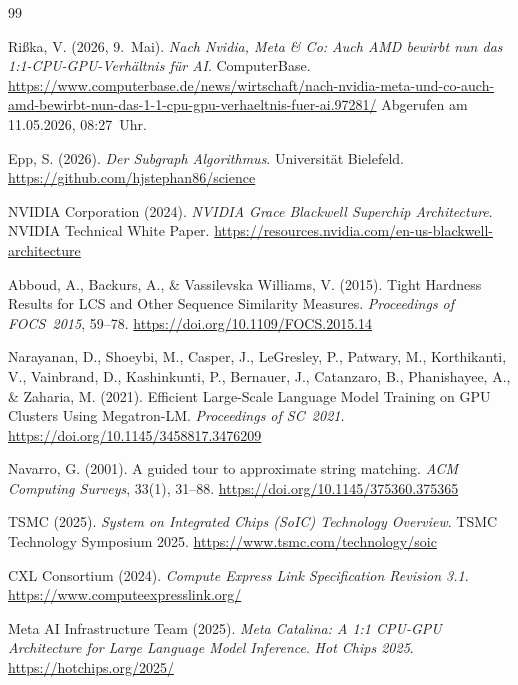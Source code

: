 ﻿\documentclass[a4paper,12pt]{article}
\theoremstyle{definition}
\begin{document}
\begin{thebibliography}{99}

Ri\ss{}ka, V. (2026, 9.\ Mai).
\textit{Nach Nvidia, Meta \& Co: Auch AMD bewirbt nun das 1:1-CPU-GPU-Verh\"altnis f\"ur AI}.
ComputerBase.
\url{https://www.computerbase.de/news/wirtschaft/nach-nvidia-meta-und-co-auch-amd-bewirbt-nun-das-1-1-cpu-gpu-verhaeltnis-fuer-ai.97281/}
Abgerufen am 11.05.2026, 08:27~Uhr.

Epp, S. (2026).
\textit{Der Subgraph Algorithmus}.
Universit\"at Bielefeld.
\url{https://github.com/hjstephan86/science}

NVIDIA Corporation (2024).
\textit{NVIDIA Grace Blackwell Superchip Architecture}.
NVIDIA Technical White Paper.
\url{https://resources.nvidia.com/en-us-blackwell-architecture}

Abboud, A., Backurs, A., \& Vassilevska Williams, V. (2015).
Tight Hardness Results for LCS and Other Sequence Similarity Measures.
\textit{Proceedings of FOCS~2015}, 59--78.
\url{https://doi.org/10.1109/FOCS.2015.14}

Narayanan, D., Shoeybi, M., Casper, J., LeGresley, P., Patwary, M.,
Korthikanti, V., Vainbrand, D., Kashinkunti, P., Bernauer, J.,
Catanzaro, B., Phanishayee, A., \& Zaharia, M. (2021).
Efficient Large-Scale Language Model Training on GPU Clusters Using
Megatron-LM.
\textit{Proceedings of SC~2021}.
\url{https://doi.org/10.1145/3458817.3476209}

Navarro, G. (2001).
A guided tour to approximate string matching.
\textit{ACM Computing Surveys}, 33(1), 31--88.
\url{https://doi.org/10.1145/375360.375365}

TSMC (2025).
\textit{System on Integrated Chips (SoIC) Technology Overview}.
TSMC Technology Symposium 2025.
\url{https://www.tsmc.com/technology/soic}

CXL Consortium (2024).
\textit{Compute Express Link Specification Revision 3.1}.
\url{https://www.computeexpresslink.org/}

Meta AI Infrastructure Team (2025).
\textit{Meta Catalina: A 1:1 CPU-GPU Architecture for Large Language Model Inference}.
\textit{Hot Chips 2025}.
\url{https://hotchips.org/2025/}


\end{thebibliography}
\end{document}
